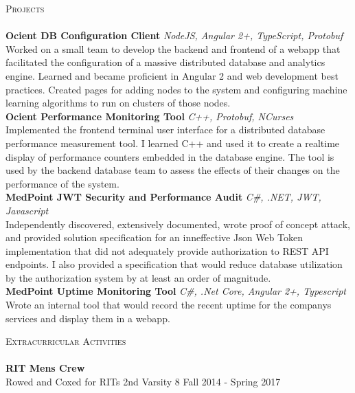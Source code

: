 \documentclass[a4paper]{article}
\newcommand{\lineunder} {
    \vspace*{-8pt} \\
    \hspace*{-18pt} \hrulefill \\
}
\newcommand{\header} [1] {
    {\hspace*{-18pt}\vspace*{6pt} \textsc{#1}}
    \vspace*{-6pt} \lineunder
}
\begin{document}
\header{Projects}
{\textbf{Ocient DB Configuration Client}} {\sl NodeJS, Angular 2+, TypeScript, Protobuf} \\
Worked on a small team to develop the backend and frontend of a webapp that facilitated the configuration of a massive distributed database and analytics engine. Learned and became proficient in Angular 2 and web development best practices. Created pages for adding nodes to the system and configuring machine learning algorithms to run on clusters of those nodes.\\
\vspace*{2mm}
{\textbf{Ocient Performance Monitoring Tool}} {\sl C++, Protobuf, NCurses} \\
Implemented the frontend terminal user interface for a distributed database performance measurement tool. I learned C++ and used it to create a realtime display of performance counters embedded in the database engine. The tool is used by the backend database team to assess the effects of their changes on the performance of the system.\\
\vspace*{2mm}
{\textbf{MedPoint JWT Security and Performance Audit}} {\sl C\#, .NET, JWT, Javascript} \\
Independently discovered, extensively documented, wrote proof of concept attack, and provided solution specification for an inneffective Json Web Token implementation that did not adequately provide authorization to REST API endpoints. I also provided a specification that would reduce database utilization by the authorization system by at least an order of magnitude.\\
\vspace*{2mm}
{\textbf{MedPoint Uptime Monitoring Tool}} {\sl C\#, .Net Core, Angular 2+, Typescript} \\
Wrote an internal tool that would record the recent uptime for the company\textquotesingle{}s services and display them in a webapp.\\
\vspace*{2mm}

\header{Extracurricular Activities}
\textbf{RIT Men\textquotesingle{}s Crew}\\
Rowed and Coxed for RIT\textquotesingle{}s 2nd Varsity 8 \hfill Fall 2014 - Spring 2017\\
\vspace*{2mm}

\ 
\end{document}
